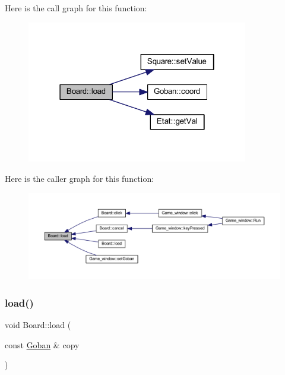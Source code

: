 Here is the call graph for this function\+:\nopagebreak
\begin{figure}[H]
\begin{center}
\leavevmode
\includegraphics[width=274pt]{class_board_a841a248dac4743611ba1825afd5d1297_cgraph}
\end{center}
\end{figure}
Here is the caller graph for this function\+:\nopagebreak
\begin{figure}[H]
\begin{center}
\leavevmode
\includegraphics[width=350pt]{class_board_a841a248dac4743611ba1825afd5d1297_icgraph}
\end{center}
\end{figure}
\mbox{\label{class_board_a3cea4df16e41c21666cf51789b7e9e78}} 
\subsubsection{\texorpdfstring{load()}{load()}\hspace{0.1cm}{\footnotesize\ttfamily [2/2]}}
{\footnotesize\ttfamily void Board\+::load (\begin{DoxyParamCaption}\item[{const \hyperlink{class_goban}{Goban} \&}]{copy }\end{DoxyParamCaption})}

